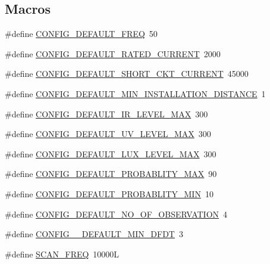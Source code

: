 \subsection*{Macros}
\begin{DoxyCompactItemize}
\item 
\#define \hyperlink{a00031_a985a153b3edd3d7d638137ae0b9e5e67}{C\+O\+N\+F\+I\+G\+\_\+\+D\+E\+F\+A\+U\+L\+T\+\_\+\+F\+R\+E\+Q}~50
\item 
\#define \hyperlink{a00031_ae329eb408f386777cbb443c27ca7c1c5}{C\+O\+N\+F\+I\+G\+\_\+\+D\+E\+F\+A\+U\+L\+T\+\_\+\+R\+A\+T\+E\+D\+\_\+\+C\+U\+R\+R\+E\+N\+T}~2000
\item 
\#define \hyperlink{a00031_a9b142f2e7d26511af74c411c0e524384}{C\+O\+N\+F\+I\+G\+\_\+\+D\+E\+F\+A\+U\+L\+T\+\_\+\+S\+H\+O\+R\+T\+\_\+\+C\+K\+T\+\_\+\+C\+U\+R\+R\+E\+N\+T}~45000
\item 
\#define \hyperlink{a00031_aad4ef21bb535ed8bbba5a4f2d0451711}{C\+O\+N\+F\+I\+G\+\_\+\+D\+E\+F\+A\+U\+L\+T\+\_\+\+M\+I\+N\+\_\+\+I\+N\+S\+T\+A\+L\+L\+A\+T\+I\+O\+N\+\_\+\+D\+I\+S\+T\+A\+N\+C\+E}~1
\item 
\#define \hyperlink{a00031_adf882de105367de21f0cbfe4490a046f}{C\+O\+N\+F\+I\+G\+\_\+\+D\+E\+F\+A\+U\+L\+T\+\_\+\+I\+R\+\_\+\+L\+E\+V\+E\+L\+\_\+\+M\+A\+X}~300
\item 
\#define \hyperlink{a00031_a29f761c18bae89d087200e4f1891c651}{C\+O\+N\+F\+I\+G\+\_\+\+D\+E\+F\+A\+U\+L\+T\+\_\+\+U\+V\+\_\+\+L\+E\+V\+E\+L\+\_\+\+M\+A\+X}~300
\item 
\#define \hyperlink{a00031_a04ab25767fbb61ec61784da889ec8c09}{C\+O\+N\+F\+I\+G\+\_\+\+D\+E\+F\+A\+U\+L\+T\+\_\+\+L\+U\+X\+\_\+\+L\+E\+V\+E\+L\+\_\+\+M\+A\+X}~300
\item 
\#define \hyperlink{a00031_a96cf926b530a1d5968881620d2f10445}{C\+O\+N\+F\+I\+G\+\_\+\+D\+E\+F\+A\+U\+L\+T\+\_\+\+P\+R\+O\+B\+A\+B\+L\+I\+T\+Y\+\_\+\+M\+A\+X}~90
\item 
\#define \hyperlink{a00031_a599be42d4b357badb7c9b16a124a186a}{C\+O\+N\+F\+I\+G\+\_\+\+D\+E\+F\+A\+U\+L\+T\+\_\+\+P\+R\+O\+B\+A\+B\+L\+I\+T\+Y\+\_\+\+M\+I\+N}~10
\item 
\#define \hyperlink{a00031_af69b35a9f07bfcfe500538565d898c65}{C\+O\+N\+F\+I\+G\+\_\+\+D\+E\+F\+A\+U\+L\+T\+\_\+\+N\+O\+\_\+\+O\+F\+\_\+\+O\+B\+S\+E\+R\+V\+A\+T\+I\+O\+N}~4
\item 
\#define \hyperlink{a00031_a0eae7c540b766617bb00f79cd63415a2}{C\+O\+N\+F\+I\+G\+\_\+\+\_\+\+D\+E\+F\+A\+U\+L\+T\+\_\+\+M\+I\+N\+\_\+\+D\+F\+D\+T}~3
\item 
\#define \hyperlink{a00031_a8127170b687c1f67a968886c128e76e4}{S\+C\+A\+N\+\_\+\+F\+R\+E\+Q}~10000\+L

\end{DoxyCompactItemize}
